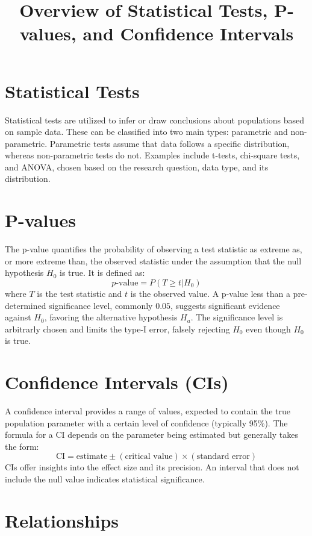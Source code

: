 \documentclass{article}
\title{Overview of Statistical Tests, P-values, and Confidence Intervals}
\author{}
\date{}
\begin{document}
\maketitle

\section{Statistical Tests}

Statistical tests are utilized to infer or draw conclusions about populations based on sample data. These can be classified into two main types: parametric and non-parametric. Parametric tests assume that data follows a specific distribution, whereas non-parametric tests do not. Examples include t-tests, chi-square tests, and ANOVA, chosen based on the research question, data type, and its distribution. 

\section{P-values}

The p-value quantifies the probability of observing a test statistic as extreme as, or more extreme than, the observed statistic under the assumption that the null hypothesis $H_0$ is true. It is defined as:
\[ p\text{-value} = P(T \geq t | H_0) \]
where $T$ is the test statistic and $t$ is the observed value. A p-value less than a pre-determined significance level, commonly $0.05$, suggests significant evidence against $H_0$, favoring the alternative hypothesis $H_a$. The significance level is arbitrarly chosen and limits the type-I error, falsely rejecting $H_0$ even though $H_0$ is true.

\section{Confidence Intervals (CIs)}

A confidence interval provides a range of values, expected to contain the true population parameter with a certain level of confidence (typically 95\%). The formula for a CI depends on the parameter being estimated but generally takes the form:
\[ \text{CI} = \text{estimate} \pm (\text{critical value}) \times (\text{standard error}) \]
CIs offer insights into the effect size and its precision. An interval that does not include the null value indicates statistical significance.

\section{Relationships}
\end{document}
